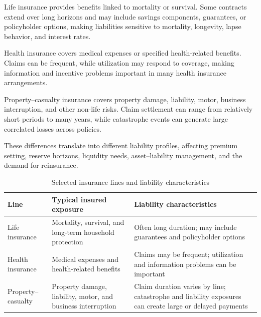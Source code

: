 Life insurance provides benefits linked to mortality or survival. Some contracts extend over long horizons and may include savings components, guarantees, or policyholder options, making liabilities sensitive to mortality, longevity, lapse behavior, and interest rates.

Health insurance covers medical expenses or specified health-related benefits. Claims can be frequent, while utilization may respond to coverage, making information and incentive problems important in many health insurance arrangements.

Property--casualty insurance covers property damage, liability, motor, business interruption, and other non-life risks. Claim settlement can range from relatively short periods to many years, while catastrophe events can generate large correlated losses across policies.

These differences translate into different liability profiles, affecting premium setting, reserve horizons, liquidity needs, asset--liability management, and the demand for reinsurance.



\begin{table}[H]

\centering

\caption{Selected insurance lines and liability characteristics}

\label{tab}

\begin{tabularx}{0.92\textwidth}{@{}p{} X X@{}}

\toprule

\textbf{Line} & \textbf{Typical insured exposure} & \textbf{Liability characteristics} \\

\midrule

Life insurance
& Mortality, survival, and long-term household protection
& Often long duration; may include guarantees and policyholder options \\

Health insurance
& Medical expenses and health-related benefits
& Claims may be frequent; utilization and information problems can be important \\

Property--casualty
& Property damage, liability, motor, and business interruption
& Claim duration varies by line; catastrophe and liability exposures can create large or delayed payments \\

\bottomrule

\end{tabularx}

\end{table}


